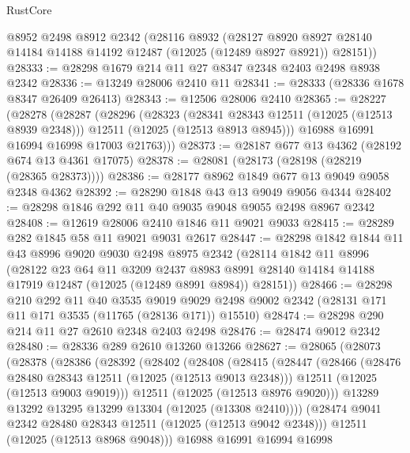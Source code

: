 \begin{lexlean}{RustCore}
\begin{coremodule}
    @8952
    @2498
    @8912
    @2342
    (@28116
      @8932
      (@28127 @8920 @8927 @28140 @14184 @14188 @14192 @12487 (@12025 (@12489 @8927 @8921)) @28151))
@28333 := @28298 @1679 @214 @11 @27 @8347 @2348 @2403 @2498 @8938 @2342
@28336 := @13249 @28006 @2410 @11
@28341 := @28333 (@28336 @1678 @8347 @26409 @26413)
@28343 := @12506 @28006 @2410
@28365 := @28227
    (@28278
      (@28287
        (@28296
          (@28323
            (@28341 @28343 @12511 (@12025 (@12513 @8939 @2348)))
            @12511
            (@12025 (@12513 @8913 @8945)))
          @16988
          @16991
          @16994
          @16998
          @17003
          @21763)))
@28373 := @28187 @677 @13 @4362 (@28192 @674 @13 @4361 @17075)
@28378 := @28081 (@28173 (@28198 (@28219 (@28365 @28373))))
@28386 := @28177 @8962 @1849 @677 @13 @9049 @9058 @2348 @4362
@28392 := @28290 @1848 @43 @13 @9049 @9056 @4344
@28402 := @28298 @1846 @292 @11 @40 @9035 @9048 @9055 @2498 @8967 @2342
@28408 := @12619 @28006 @2410 @1846 @11 @9021 @9033
@28415 := @28289 @282 @1845 @58 @11 @9021 @9031 @2617
@28447 := @28298
    @1842
    @1844
    @11
    @43
    @8996
    @9020
    @9030
    @2498
    @8975
    @2342
    (@28114
      @1842
      @11
      @8996
      (@28122
        @23
        @64
        @11
        @3209
        @2437
        @8983
        @8991
        @28140
        @14184
        @14188
        @17919
        @12487
        (@12025 (@12489 @8991 @8984))
        @28151))
@28466 := @28298
    @210
    @292
    @11
    @40
    @3535
    @9019
    @9029
    @2498
    @9002
    @2342
    (@28131 @171 @11 @171 @3535 (@11765 (@28136 @171)) @15510)
@28474 := @28298 @290 @214 @11 @27 @2610 @2348 @2403 @2498
@28476 := @28474 @9012 @2342
@28480 := @28336 @289 @2610 @13260 @13266
@28627 := @28065
    (@28073
      (@28378
        (@28386
          (@28392
            (@28402
              (@28408
                (@28415
                  (@28447
                    (@28466
                      (@28476 @28480 @28343 @12511 (@12025 (@12513 @9013 @2348)))
                      @12511
                      (@12025 (@12513 @9003 @9019)))
                    @12511
                    (@12025 (@12513 @8976 @9020)))
                  @13289
                  @13292
                  @13295
                  @13299
                  @13304
                  (@12025 (@13308 @2410))))
              (@28474 @9041 @2342 @28480 @28343 @12511 (@12025 (@12513 @9042 @2348)))
              @12511
              (@12025 (@12513 @8968 @9048)))
            @16988
            @16991
            @16994
            @16998

\end{coremodule}
\end{lexlean}
